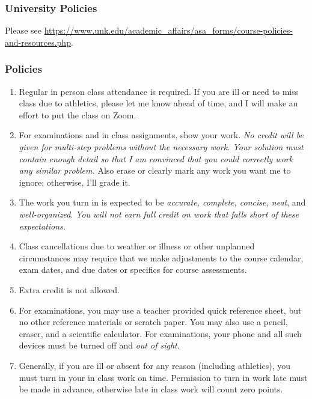 \documentclass[12pt]{article}
\newcounter{ex}\setcounter{ex}{0}
\begin{document}
\subsubsection*{University Policies}

Please see \url{https://www.unk.edu/academic_affairs/asa_forms/course-policies-and-resources.php}.

\subsubsection* {Policies}


 

\begin{enumerate}

\item Regular in person class attendance is required. If you are ill or need to miss class due to athletics, please let me know ahead of time, and I will make an effort to put the class on Zoom.

\item For examinations and in class assignments, show your work.  \emph{No credit will be given for multi-step problems without the necessary work. Your solution must contain enough detail
so that I am convinced that you could correctly work any similar problem.} Also erase or clearly mark any work you want me to ignore; otherwise,
I'll grade it.  

\item The work you turn in is expected to be \emph{accurate, 
complete, concise, neat}, and \emph{well-organized}.  
\emph{You will not earn full credit on work that falls short of 
these expectations.}

\item Class cancellations due to weather or illness or other 
unplanned circumstances may require that we make  adjustments
to the course calendar, exam dates, and due dates or specifics for 
course assessments. 


\item Extra credit is not allowed. 



\item For examinations, you may use a teacher provided quick reference sheet, 
but no other reference materials or scratch paper. You may also use a pencil, eraser, 
and a scientific calculator. For examinations, your phone and all such
devices must be turned off and \emph{out of sight}. 

\item Generally, if you are ill or absent for any reason (including 
athletics), you must turn in your in class work on time. Permission to
turn in work late must be made in advance, otherwise late in class work 
will count zero points.



\end{enumerate}
\end{document}
